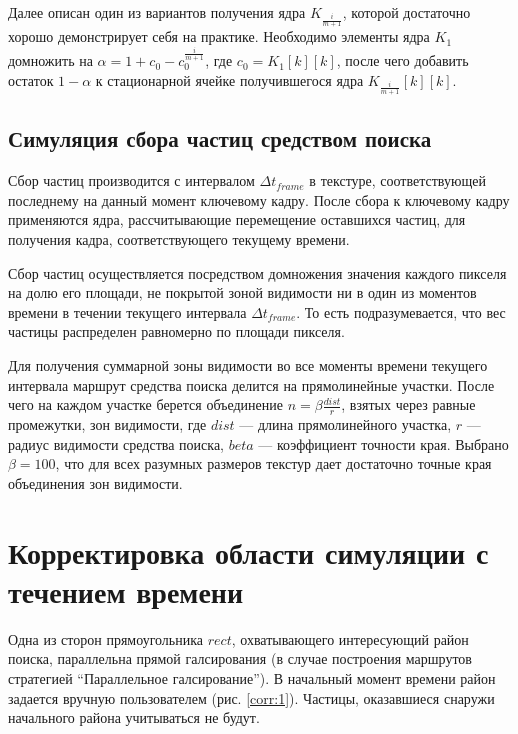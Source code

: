 Далее описан один из вариантов получения ядра $K_{\frac {i} {m + 1}}$, которой достаточно
хорошо демонстрирует себя на практике. Необходимо элементы ядра $K_{1}$ домножить на
$\alpha = 1 + c_0 - c_0^{\frac {i} {m+1}}$, где $c_0 = K_{1}[k][k]$, после чего добавить 
остаток $1 - \alpha$ к стационарной ячейке получившегося ядра $K_{\frac {i} {m + 1}}[k][k]$.
\FloatBarrier
\subsection{Симуляция сбора частиц средством поиска}
Сбор частиц производится с интервалом $\Delta t_{frame}$ в текстуре, соответствующей последнему
на данный момент ключевому кадру. После сбора к ключевому кадру применяются ядра,
рассчитывающие перемещение оставшихся частиц, для получения кадра, соответствующего
текущему времени.

Сбор частиц осуществляется посредством домножения значения каждого пикселя на долю его площади,
не покрытой зоной видимости ни в один из моментов времени в течении текущего интервала
$\Delta t_{frame}$. То есть подразумевается, что вес частицы распределен равномерно по площади
пикселя.

 Для получения суммарной зоны видимости во все моменты времени текущего интервала маршрут
средства поиска делится на прямолинейные участки. После чего на каждом участке берется объединение
$n = \beta \frac{dist}{r}$, взятых через равные промежутки, зон видимости, где $dist$ --- длина
прямолинейного участка, $r$ --- радиус видимости средства поиска, $beta$ --- коэффициент
точности края. Выбрано $\beta = 100$, что для всех разумных размеров текстур дает достаточно точные
края объединения зон видимости.

\FloatBarrier
\section{Корректировка области симуляции с течением времени}
\begin{figure}[ht]
  \centering
\begin{minipage}[t]{.48\textwidth}
  \centering
  \label{corr:1}
\end{minipage}
\begin{minipage}[t]{.48\textwidth}
  \centering
  \label{corr:2}
\end{minipage}
\end{figure}
Одна из сторон прямоугольника $rect$, охватывающего интересующий район поиска, параллельна прямой
галсирования (в случае построения маршрутов стратегией ``Параллельное галсирование''). 
В начальный момент времени район задается вручную пользователем (рис. \ref{corr:1}).
Частицы, оказавшиеся снаружи начального района учитываться не будут.

